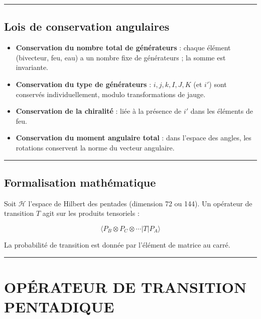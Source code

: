 \documentclass[11pt]{article}
\providecommand{\tightlist}{%
\setlength{\itemsep}{2pt}\setlength{\parskip}{6pt}
}
\begin{document}
\begin{center}\rule{0.5\linewidth}{0.5pt}\end{center}

\hypertarget{lois-de-conservation-angulaires}{%
\subsection{Lois de conservation
angulaires}\label{lois-de-conservation-angulaires}}

\begin{itemize}
\tightlist
\item
  \textbf{Conservation du nombre total de générateurs} : chaque élément
  (bivecteur, feu, eau) a un nombre fixe de générateurs ; la somme est
  invariante.
\item
  \textbf{Conservation du type de générateurs} : \(i,j,k,I,J,K\) (et
  \(i'\)) sont conservés individuellement, modulo transformations de
  jauge.
\item
  \textbf{Conservation de la chiralité} : liée à la présence de \(i'\)
  dans les éléments de feu.
\item
  \textbf{Conservation du moment angulaire total} : dans l'espace des
  angles, les rotations conservent la norme du vecteur angulaire.
\end{itemize}

\begin{center}\rule{0.5\linewidth}{0.5pt}\end{center}

\hypertarget{formalisation-mathuxe9matique}{%
\subsection{Formalisation
mathématique}\label{formalisation-mathuxe9matique}}

Soit \(\mathcal{H}\) l'espace de Hilbert des pentades (dimension 72 ou
144). Un opérateur de transition \(T\) agit sur les produits tensoriels
:

\[
\langle P_B \otimes P_C \otimes \cdots | T | P_A \rangle
\]

La probabilité de transition est donnée par l'élément de matrice au
carré.

\begin{center}\rule{0.5\linewidth}{0.5pt}\end{center}

\hypertarget{opuxe9rateur-de-transition-pentadique}{%
\section{OPÉRATEUR DE TRANSITION
PENTADIQUE}\label{opuxe9rateur-de-transition-pentadique}}
\end{document}
